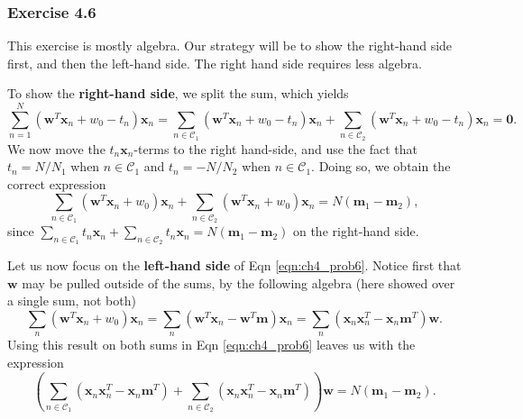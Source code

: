 \documentclass[12pt, a4paper]{article}
\newcommand{\vect}[1]{\bm{#1}}
\begin{document}
\subsubsection*{Exercise 4.6}
This exercise is mostly algebra.
Our strategy will be to show the right-hand side first, and then the left-hand side.
The right hand side requires less algebra.

To show the \textbf{right-hand side}, we split the sum, which yields
\begin{equation*}
	\sum_{n=1}^{N} \left( \vect{w}^T \vect{x}_n + w_0 - t_n \right) \vect{x}_n
	=
	\sum_{n \in \mathcal{C}_1} \left( \vect{w}^T \vect{x}_n + w_0 - t_n \right) \vect{x}_n
	+
	\sum_{n \in \mathcal{C}_2} \left( \vect{w}^T \vect{x}_n + w_0 - t_n \right) \vect{x}_n
	 = \vect{0}.
\end{equation*}
We now move the $t_n\vect{x}_n$-terms to the right hand-side, and use the fact that $t_n = N / N_1$ when $n \in \mathcal{C}_1$ and $t_n = -N / N_2$ when $n \in \mathcal{C}_1$.
Doing so, we obtain the correct expression
\begin{equation}
\label{eqn:ch4_prob6}
\sum_{n \in \mathcal{C}_1} \left( \vect{w}^T \vect{x}_n + w_0 \right) \vect{x}_n
+
\sum_{n \in \mathcal{C}_2} \left( \vect{w}^T \vect{x}_n + w_0  \right) \vect{x}_n
=
N (\vect{m}_1 - \vect{m}_2),
\end{equation}
since $
\sum_{n \in \mathcal{C}_1}  t_n \vect{x}_n
+
\sum_{n \in \mathcal{C}_2}  t_n \vect{x}_n
= 
N (\vect{m}_1 - \vect{m}_2)
$ on the right-hand side.

Let us now focus on the \textbf{left-hand side} of Eqn \eqref{eqn:ch4_prob6}.
Notice first that $\vect{w}$ may be pulled outside of the sums, by the following algebra (here showed over a single sum, not both)
\begin{equation*}
	\sum_{n} \left( \vect{w}^T \vect{x}_n + w_0 \right) \vect{x}_n
	=
	\sum_{n} \left( \vect{w}^T \vect{x}_n  - \vect{w}^T \vect{m} \right) \vect{x}_n
	=
	\sum_{n} \left( \vect{x}_n \vect{x}_n^T - \vect{x}_n \vect{m}^T \right) \vect{w}.
\end{equation*}
Using this result on both sums in Eqn \eqref{eqn:ch4_prob6} leaves us with the expression
\begin{equation*}
\left( \sum_{n \in \mathcal{C}_1} \left(\vect{x}_n \vect{x}_n^T - \vect{x}_n \vect{m}^T \right) 
+
\sum_{n \in \mathcal{C}_2} \left( \vect{x}_n \vect{x}_n^T - \vect{x}_n \vect{m}^T  \right) \right) \vect{w}
= 
N (\vect{m}_1 - \vect{m}_2).
\end{equation*}
\end{document}
